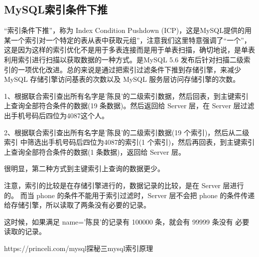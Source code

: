 \documentclass[../../../interview-questions.tex]{subfiles}
\begin{document}
\subsection{MySQL索引条件下推}

“索引条件下推”，称为 Index Condition Pushdown (ICP)，这是MySQL提供的用某一个索引对一个特定的表从表中获取元组”，注意我们这里特意强调了“一个”，这是因为这样的索引优化不是用于多表连接而是用于单表扫描，确切地说，是单表利用索引进行扫描以获取数据的一种方式。是MySQL 5.6 发布后针对扫描二级索引的一项优化改进。总的来说是通过把索引过滤条件下推到存储引擎，来减少 MySQL 存储引擎访问基表的次数以及 MySQL 服务层访问存储引擎的次数。

1、根据联合索引查出所有名字是’陈艮’的二级索引数据，然后回表，到主键索引上查询全部符合条件的数据(19 条数据)。然后返回给 Server 层，在 Server 层过滤出手机号码后四位为4087这个人。

2、根据联合索引查出所有名字是’陈艮’的二级索引数据(19 个索引)，然后从二级索引 中筛选出手机号码后四位为4087的索引(1 个索引)，然后再回表，到主键索引上查询全部符合条件的数据(1 条数据)，返回给 Server 层。

很明显，第二种方式到主键索引上查询的数据更少。

注意，索引的比较是在存储引擎进行的，数据记录的比较，是在 Server 层进行的。 而当 phone 的条件不能用于索引过滤时，Server 层不会把 phone 的条件传递 给存储引擎，所以读取了两条没有必要的记录。

这时候，如果满足 name=’陈艮’的记录有 100000 条，就会有 99999 条没有 必要读取的记录。

https://princeli.com/mysql探秘三mysql索引原理
\end{document}
